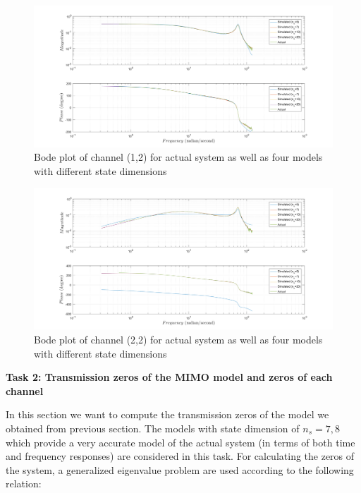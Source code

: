 \documentclass[paper=US leter, fontsize=11pt]{scrartcl}
\begin{document}
\begin{figure}[ht!]  
	\centering    
	\includegraphics[scale=0.4,trim={5cm 0 0 0},clip]{task133.png}  
	\caption{Bode plot of channel (1,2) for actual system as well as four models with different state dimensions}
	\label{task123} 
\end{figure} 

\begin{figure}[ht!]  
	\centering    
	\includegraphics[scale=0.4,trim={5cm 0 0 0},clip]{task134.png}  
	\caption{Bode plot of channel (2,2) for actual system as well as four models with different state dimensions}
	\label{task123} 
\end{figure} 

\clearpage
\textbf{Task 2: Transmission zeros of the MIMO model and zeros of each channel}

In this section we want to compute the transmission zeros of the model we obtained from previous section. The models with state dimension of $n_{s}=7,8$ which provide a very accurate model of the actual system (in terms of both time and frequency responses) are considered in this task. For calculating the zeros of the system, a generalized eigenvalue problem are used according to the following relation:
\end{document}
